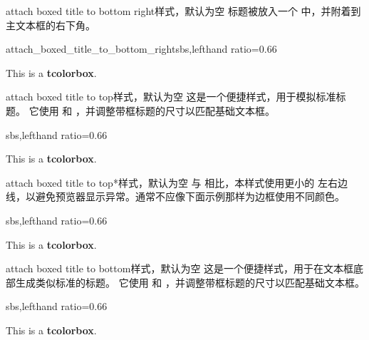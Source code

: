 \begin{docTcbKey}{attach boxed title to bottom right}{}{样式，默认为空}
标题被放入一个  中，并附着到主文本框的右下角。
\begin{exdispExample*}{attach_boxed_title_to_bottom_right}{sbs,lefthand ratio=0.66}
\begin{tcolorbox}[enhanced,title=My title,
  attach boxed title to bottom right]
  This is a \textbf{tcolorbox}.
\end{tcolorbox}
\end{exdispExample*}
\end{docTcbKey}


\clearpage
\begin{docTcbKey}[][doc new=2016-02-26]{attach boxed title to top}{}{样式，默认为空}
  这是一个便捷样式，用于模拟标准标题。
  它使用 
  和 ，并调整带框标题的尺寸以匹配基础文本框。
\begin{dispExample*}{sbs,lefthand ratio=0.66}
\begin{tcolorbox}[enhanced,title=My title,
  attach boxed title to top,
  boxed title style={colframe=red}]
  This is a \textbf{tcolorbox}.
\end{tcolorbox}
\end{dispExample*}
\end{docTcbKey}

\begin{docTcbKey}[][doc new=2016-02-26]{attach boxed title to top*}{}{样式，默认为空}
  与  相比，本样式使用更小的
  左右边线，以避免预览器显示异常。通常不应像下面示例那样为边框使用不同颜色。
\begin{dispExample*}{sbs,lefthand ratio=0.66}
\begin{tcolorbox}[enhanced,title=My title,
  attach boxed title to top*,
  boxed title style={colframe=red}]
  This is a \textbf{tcolorbox}.
\end{tcolorbox}
\end{dispExample*}
\end{docTcbKey}

\begin{docTcbKey}[][doc new=2016-02-26]{attach boxed title to bottom}{}{样式，默认为空}
  这是一个便捷样式，用于在文本框底部生成类似标准的标题。
  它使用 
  和 ，并调整带框标题的尺寸以匹配基础文本框。
\begin{dispExample*}{sbs,lefthand ratio=0.66}
\begin{tcolorbox}[enhanced,title=My title,
  attach boxed title to bottom,
  boxed title style={colframe=red}]
  This is a \textbf{tcolorbox}.
\end{tcolorbox}
\end{dispExample*}
\end{docTcbKey}

